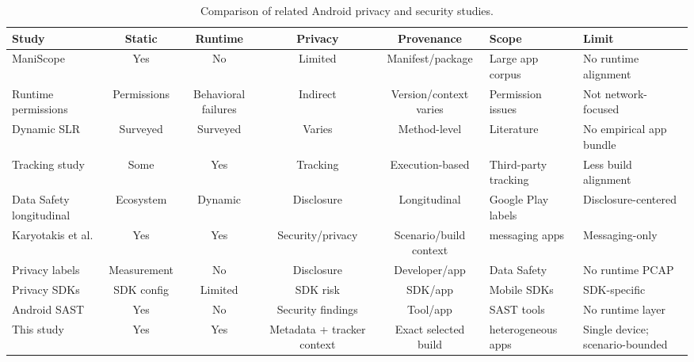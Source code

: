 \begin{table}[!t]
\centering
\caption{Comparison of related Android privacy and security studies.}
\label{tab:literature-comparison}
\scriptsize
\setlength{\tabcolsep}{3.2pt}
\renewcommand{\arraystretch}{1.08}
\begin{tabularx}{\textwidth}{@{}>{\raggedright\arraybackslash}p{}cccc>{\raggedright\arraybackslash}p{}>{\raggedright\arraybackslash}X@{}}
\toprule
Study & Static & Runtime & Privacy & Provenance & Scope & Limit \\
\midrule
ManiScope \cite{yang2022maniscope} & Yes & No & Limited & Manifest/package & Large app corpus & No runtime alignment \\
Runtime permissions \cite{wang2023runtimepermissions} & Permissions & Behavioral failures & Indirect & Version/context varies & Permission issues & Not network-focused \\
Dynamic SLR \cite{sutter2024dynamic} & Surveyed & Surveyed & Varies & Method-level & Literature & No empirical app bundle \\
Tracking study \cite{paci2023tracking} & Some & Yes & Tracking & Execution-based & Third-party tracking & Less build alignment \\
Data Safety longitudinal \cite{arkalakis2024datasafety} & Ecosystem & Dynamic & Disclosure & Longitudinal & Google Play labels & Disclosure-centered \\
Karyotakis et al. \cite{karyotakis2026messaging} & Yes & Yes & Security/privacy & Scenario/build context & 3 messaging apps & Messaging-only \\
Privacy labels \cite{khandelwal2024privacylabels} & Measurement & No & Disclosure & Developer/app & Data Safety & No runtime PCAP \\
Privacy SDKs \cite{zhang2024privacysdks} & SDK config & Limited & SDK risk & SDK/app & Mobile SDKs & SDK-specific \\
Android SAST \cite{zhu2024sastandroid} & Yes & No & Security findings & Tool/app & SAST tools & No runtime layer \\
This study & Yes & Yes & Metadata + tracker context & Exact selected build & 15 heterogeneous apps & Single device; scenario-bounded \\
\bottomrule
\end{tabularx}
\end{table}
